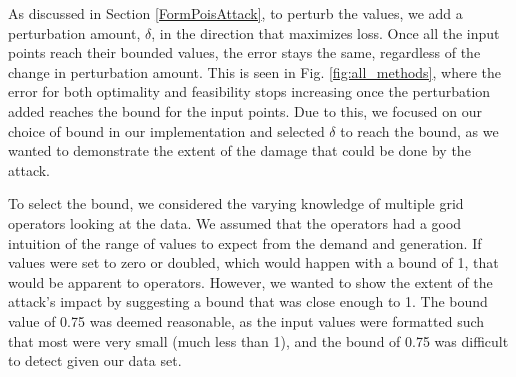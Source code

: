 As discussed in Section \ref{FormPoisAttack}, to perturb the values, we add a perturbation amount, $\delta$, in the direction that maximizes loss. Once all the input points reach their bounded values, the error stays the same, regardless of the change in perturbation amount. This is seen in Fig. \ref{fig:all_methods},  where the error for both optimality and feasibility stops increasing once the perturbation added reaches the bound for the input points. Due to this, we focused on our choice of bound in our implementation and selected $\delta$ to reach the bound, as we wanted to demonstrate the extent of the damage that could be done by the attack. 

To select the bound, we considered the varying knowledge of multiple grid operators looking at the data. We assumed that the operators had a good intuition of the range of values to expect from the demand and generation. If values were set to zero or doubled, which would happen with a bound of 1, that would be apparent to operators. However, we wanted to show the extent of the attack's impact by suggesting a bound that was close enough to 1. The bound value of 0.75 was deemed reasonable, as the input values were formatted such that most were very small (much less than 1), and the bound of 0.75 was difficult to detect given our data set. 




